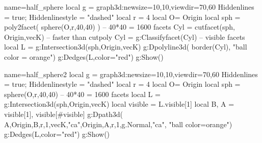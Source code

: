 \documentclass{standalone}
\begin{document}
\begin{luadraw}{name=half_sphere}
local g = graph3d:new{size={10,10},viewdir={70,60}}
Hiddenlines = true; Hiddenlinestyle = "dashed"
local r = 4
local O= Origin
local sph = poly2facet( sphere(O,r,40,40) ) -- 40*40 = 1600 facets
Cyl = cutfacet(sph, {Origin,vecK}) -- faster than cutpoly
Cyl = g:Classifyfacet(Cyl) -- visible facets
local L = g:Intersection3d(sph,{Origin,vecK})
g:Dpolyline3d( border(Cyl), "ball color = orange")
g:Dedges(L,{color="red"})
 g:Show()
\end{luadraw}

\begin{luadraw}{name=half_sphere2}
local g = graph3d:new{size={10,10},viewdir={70,60}}
Hiddenlines = true; Hiddenlinestyle = "dashed"
local r = 4
local O= Origin
local sph = sphere(O,r,40,40) -- 40*40 = 1600 facets
local L = g:Intersection3d(sph,{Origin,vecK})
local visible = L.visible[1]
local B, A = visible[1], visible[#visible]
g:Dpath3d( {A,Origin,B,r,1,vecK,"ca",Origin,A,r,1,g.Normal,"ca"}, "ball color=orange")
g:Dedges(L,{color="red"})
 g:Show()
\end{luadraw}
\end{document}
